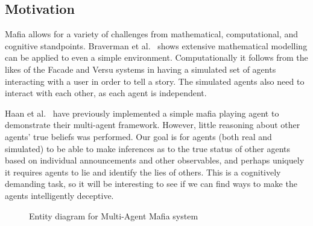 \documentclass[12pt]{article} %
\begin{document}

\subsection{Motivation} 

Mafia allows for a variety of challenges from mathematical, computational, and cognitive standpoints. Braverman et al.~\cite{BRA2008} shows extensive mathematical modelling can be applied to even a simple environment. Computationally it follows from the likes of the Facade and Versu systems in having a simulated set of agents interacting with a user in order to tell a story. The simulated agents also need to interact with each other, as each agent is independent. 

Haan et al.~\cite{HAA2004} have previously implemented a simple mafia playing agent to demonstrate their multi-agent framework. However, little reasoning about other agents' true beliefs was performed. Our goal is for agents (both real and simulated) to be able to make inferences as to the true status of other agents based on individual announcements and other observables, and perhaps uniquely it requires agents to lie and identify the lies of others. This is a cognitively demanding task, so it will be interesting to see if we can find ways to make the agents intelligently deceptive. 


\begin{figure}[H] 
\caption{Entity diagram for Multi-Agent Mafia system}
\end{figure}
\end{document}
